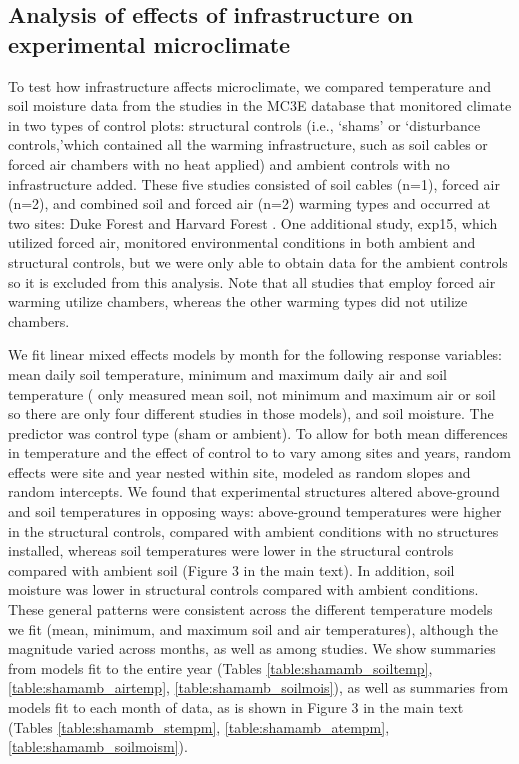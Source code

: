 \documentclass{article}
\begin{document}
\subsection* {Analysis of effects of infrastructure on experimental microclimate}
To test how infrastructure affects microclimate, we compared temperature and soil moisture data from the studies in the MC3E database that monitored climate in two types of control plots: structural controls (i.e., `shams' or `disturbance controls,'which contained all the warming infrastructure, such as soil cables or forced air chambers with no heat applied) and ambient controls with no infrastructure added. These five studies consisted of soil cables (n=1), forced air (n=2), and combined soil and forced air (n=2) warming types and occurred at two sites: Duke Forest and Harvard Forest \citep{farnsworth1995,clark2014a,marchin2015,pelini2011}. One additional study, exp15, which utilized forced air, monitored environmental conditions in both ambient and structural controls, but we were only able to obtain data for the ambient controls so it is excluded from this analysis. Note that all studies that employ forced air warming utilize chambers, whereas the other warming types did not utilize chambers.
\par We fit linear mixed effects models by month for the following response variables: mean daily soil temperature, minimum and maximum daily air and soil temperature (\citet{farnsworth1995} only measured mean soil, not minimum and maximum air or soil so there are only four different studies in those models), and soil moisture. The predictor was control type (sham or ambient). To allow for both mean differences in temperature and the effect of control to to vary among sites and years, random effects were site and year nested within site, modeled as random slopes and random intercepts. 
We found that experimental structures altered above-ground and soil temperatures in opposing ways: above-ground temperatures were higher in the structural controls, compared with ambient conditions with no structures installed, whereas soil temperatures were lower in the structural controls compared with ambient soil (Figure 3 in the main text).  In addition, soil moisture was lower in structural controls compared with ambient conditions. These general patterns were consistent across the different temperature models we fit (mean, minimum, and maximum soil and air temperatures), although the magnitude varied across months, as well as among studies. We show summaries from models fit to the entire year (Tables \ref{table:shamamb_soiltemp}, \ref{table:shamamb_airtemp}, \ref{table:shamamb_soilmois}), as well as summaries from models fit to each month of data, as is shown in Figure 3 in the main text (Tables \ref{table:shamamb_stempm}, \ref{table:shamamb_atempm}, \ref{table:shamamb_soilmoism}).
\end{document}
